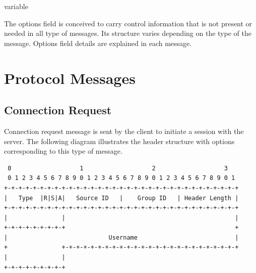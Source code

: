\documentclass{article}
\begin{document}
\begin{description}[align=left]
    \item [Options:] variable
    \begin{flushleft}
        The options field is conceived to carry control information that is not present or needed in all type of messages. Its structure varies depending on the type of the message. Options field details are explained in each message.
    \end{flushleft}
    
\end{description}

\section{Protocol Messages}

\subsection{Connection Request}
Connection request message is sent by the client to initiate a session with the server. The following diagram illustrates the header structure with options corresponding to this type of message.
\clearpage
\begin{verbatim}  
 0                   1                   2                   3  
 0 1 2 3 4 5 6 7 8 9 0 1 2 3 4 5 6 7 8 9 0 1 2 3 4 5 6 7 8 9 0 1
+-+-+-+-+-+-+-+-+-+-+-+-+-+-+-+-+-+-+-+-+-+-+-+-+-+-+-+-+-+-+-+-+
|   Type  |R|S|A|   Source ID   |    Group ID   | Header Length |
+-+-+-+-+-+-+-+-+-+-+-+-+-+-+-+-+-+-+-+-+-+-+-+-+-+-+-+-+-+-+-+-+
|               |                                               |
+-+-+-+-+-+-+-+-+                                               +
|                            Username                           |
+               +-+-+-+-+-+-+-+-+-+-+-+-+-+-+-+-+-+-+-+-+-+-+-+-+
|               |
+-+-+-+-+-+-+-+-+
\end{verbatim}
\end{document}
